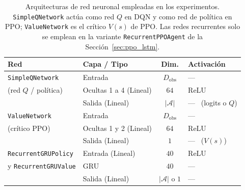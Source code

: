 \begin{table}[htbp]
    \centering
    \caption[Arquitecturas de red neuronal]{Arquitecturas de red neuronal
    empleadas en los experimentos. \texttt{SimpleQNetwork} actúa como red
    $Q$ en DQN y como red de política en PPO; \texttt{ValueNetwork} es el
    crítico $V(s)$ de PPO. Las redes recurrentes solo se emplean en la
    variante \texttt{RecurrentPPOAgent} de la
    Sección~\ref{sec:ppo_lstm}.}
    \label{tab:arquitectura_redes}
    \begin{tabular}{llcl}
        \toprule
        \textbf{Red} & \textbf{Capa / Tipo} & \textbf{Dim.} & \textbf{Activación} \\
        \midrule
        \texttt{SimpleQNetwork} & Entrada & $D_{\text{obs}}$ & --- \\
        (red $Q$ / política)    & Ocultas 1 a 4 (Lineal) & $64$ & ReLU \\
                                & Salida (Lineal) & $|\mathcal{A}|$ & --- \ (logits o $Q$) \\
        \midrule
        \texttt{ValueNetwork}   & Entrada & $D_{\text{obs}}$ & --- \\
        (crítico PPO)           & Ocultas 1 y 2 (Lineal) & $64$ & ReLU \\
                                & Salida (Lineal) & $1$ & --- \ ($V(s)$) \\
        \midrule
        \texttt{RecurrentGRUPolicy} & Entrada (Lineal) & $40$ & ReLU \\
        y \texttt{RecurrentGRUValue} & GRU & $40$ & --- \\
                                & Salida (Lineal) & $|\mathcal{A}|$ o $1$ & --- \\
        \bottomrule
    \end{tabular}
\end{table}

